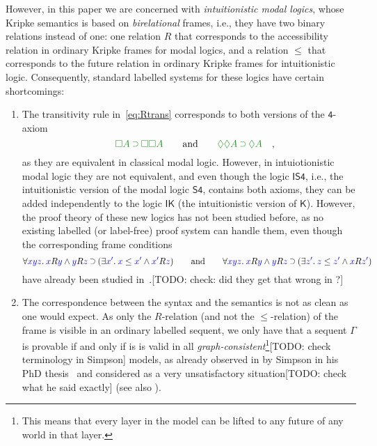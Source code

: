\documentclass[a4paper]{article}
\theoremstyle{plain}
\theoremstyle{definition}
\newcommand{\todo}[1]{{\color{red}[TODO: #1]}}
\newcommand*{\IK}{\mathsf{IK}}
\newcommand*{\K}{\mathsf{K}}
\newcommand*{\ISfour}{\mathsf{IS4}}
\newcommand*{\Sfour}{\mathsf{S4}}
\newcommand{\fourax}{\mathsf{4}}
\newcommand*{\AND}{\mathbin{\wedge}}
\newcommand*{\IMP}{\mathbin{\scalebox{.9}{\raise.2ex\hbox{$\supset$}}}}
\newcommand*{\BOX}{\mathord{\Box}}
\newcommand*{\DIA}{\mathord{\Diamond}}
\newcommand*{\fm}[1]{{\color{notgreen}{#1}}}
\newcommand*{\lb}[1]{{\color{blue}{#1}}}
\newcommand*{\accs}[2]{\lb{#1}R\lb{#2}}
\newcommand*{\futs}[2]{\lb{#1}\le{\color{blue}{#2}}}
\newcommand{\qquand}{\qquad\mbox{and}\qquad}
\newcommand{\quadcm}{\rlap{\quad,}}
\begin{document}
However,
in this paper we are concerned with \emph{intuitionistic modal
  logics}, whose Kripke semantics is based on \emph{birelational}
frames, i.e., they have two binary relations instead of one: one
relation $R$ that corresponds to the accessibility relation in
ordinary Kripke frames for modal logics, and a relation $\le$ that
corresponds to the future relation in ordinary Kripke frames for
intuitionistic logic. Consequently, standard labelled systems for
these logics have certain shortcomings:
\begin{enumerate}
\item The transitivity rule in~\eqref{eq:Rtrans} corresponds to both
  versions of the $\fourax$-axiom
  \begin{equation}
    \label{eq:4ax}
    \fm{\BOX A\IMP \BOX\BOX A}
    \qquand
    \fm{\DIA\DIA A\IMP\DIA A}
    \quadcm
  \end{equation}
  as they are equivalent in classical
  modal logic. However, in intuiotionistic modal logic they are not
  equivalent, and even though the logic $\ISfour$, i.e., the
  intuitionistic version of the modal logic $\Sfour$, contains both
  axioms, they can be added independently to the logic $\IK$ (the
  intuitionistic version of $\K$). However, the proof theory of these
  new logics has not been studied before, as no existing labelled (or
  label-free) proof system can handle them, even though the
  corresponding frame conditions
  \begin{equation}
    \label{eq:4frame}
    \forall\lb{xyz}.\:\accs xy\AND \accs yz\IMP(\exists\lb{x'}.\:\futs x{x'}\AND\accs {x'}z)
    \qquand
    \forall\lb{xyz}.\:\accs xy\AND \accs yz\IMP(\exists\lb{z'}.\:\futs z{z'}\AND\accs {x}{z'})
  \end{equation}
  have already been studied
  in~\cite{Plotkin}.\todo{check: did they get that wrong in  \cite{Plotkin}?}
\item The correspondence between the syntax and the semantics is not
  as clean as one would expect. As only the $R$-relation (and not the
  $\le$-relation) of the frame is visible in an ordinary labelled
  sequent, we only have that a sequent $\Gamma$ is provable if and
  only if is is valid in all \emph{graph-consistent}\footnote{This
    means that every layer in the model can be lifted to any future of
    any world in that layer.}\todo{check terminology in Simpson} models, as
  already observed in by Simpson in his PhD thesis~\cite{simpson:phd}
  and considered as a very unsatisfactory situation\todo{check what he
    said exactly} (see also \cite{mar:str:indexed}).
\end{enumerate}
\end{document}

